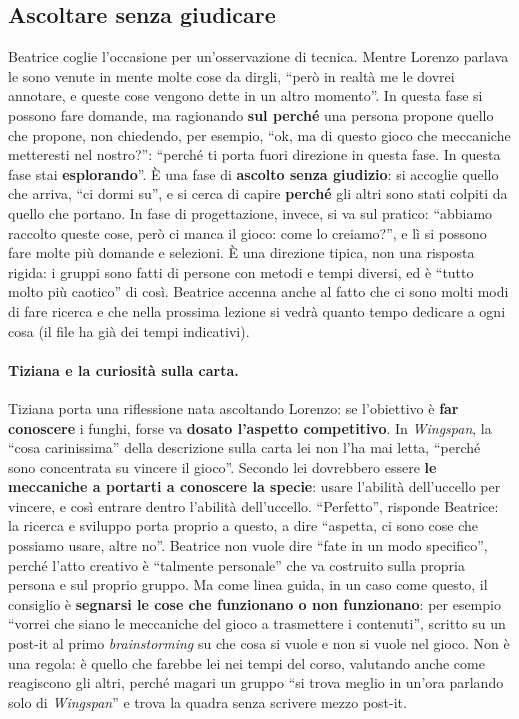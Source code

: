 \subsection{Ascoltare senza giudicare}
\label{a7:sec:ascolto}

Beatrice coglie l'occasione per un'osservazione di tecnica. Mentre Lorenzo parlava le
sono venute in mente molte cose da dirgli, ``però in realtà me le dovrei annotare, e
queste cose vengono dette in un altro momento''. In questa fase si possono fare
domande, ma ragionando \textbf{sul perché} una persona propone quello che propone, non
chiedendo, per esempio, ``ok, ma di questo gioco che meccaniche metteresti nel
nostro?'': ``perché ti porta fuori direzione in questa fase. In questa fase stai
\textbf{esplorando}''. È una fase di \textbf{ascolto senza giudizio}: si accoglie
quello che arriva, ``ci dormi su'', e si cerca di capire \textbf{perché} gli altri
sono stati colpiti da quello che portano. In fase di progettazione, invece, si va sul
pratico: ``abbiamo raccolto queste cose, però ci manca il gioco: come lo creiamo?'', e
lì si possono fare molte più domande e selezioni. È una direzione tipica, non una
risposta rigida: i gruppi sono fatti di persone con metodi e tempi diversi, ed è
``tutto molto più caotico'' di così. Beatrice accenna anche al fatto che ci sono
molti modi di fare ricerca e che nella prossima lezione si vedrà quanto tempo
dedicare a ogni cosa (il file ha già dei tempi indicativi).

\paragraph{Tiziana e la curiosità sulla carta.} Tiziana porta una riflessione nata
ascoltando Lorenzo: se l'obiettivo è \textbf{far conoscere} i funghi, forse va
\textbf{dosato l'aspetto competitivo}. In \emph{Wingspan}, la ``cosa carinissima'' della
descrizione sulla carta lei non l'ha mai letta, ``perché sono concentrata su vincere il
gioco''. Secondo lei dovrebbero essere \textbf{le meccaniche a portarti a conoscere la
specie}: usare l'abilità dell'uccello per vincere, e così entrare dentro l'abilità
dell'uccello. ``Perfetto'', risponde Beatrice: la ricerca e sviluppo porta proprio a
questo, a dire ``aspetta, ci sono cose che possiamo usare, altre no''. Beatrice non
vuole dire ``fate in un modo specifico'', perché l'atto creativo è ``talmente
personale'' che va costruito sulla propria persona e sul proprio gruppo. Ma come
linea guida, in un caso come questo, il consiglio è \textbf{segnarsi le cose che
funzionano o non funzionano}: per esempio ``vorrei che siano le meccaniche del gioco a
trasmettere i contenuti'', scritto su un post-it al primo \emph{brainstorming} su che
cosa si vuole e non si vuole nel gioco. Non è una regola: è quello che farebbe lei nei
tempi del corso, valutando anche come reagiscono gli altri, perché magari un gruppo
``si trova meglio in un'ora parlando solo di \emph{Wingspan}'' e trova la quadra senza
scrivere mezzo post-it.

